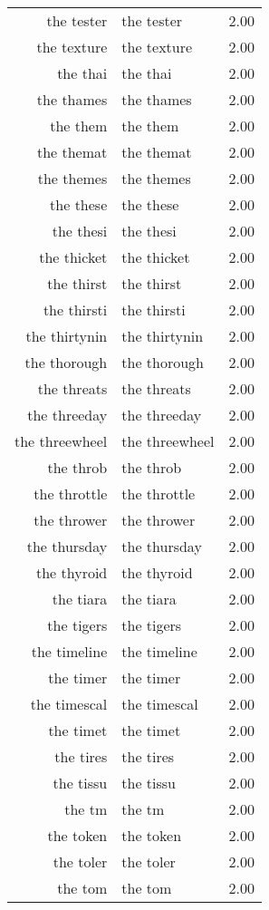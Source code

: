 \begin{table}[ht]
\begin{tabular}{rlr}
  the tester & the tester & 2.00 \\ 
  the texture & the texture & 2.00 \\ 
  the thai & the thai & 2.00 \\ 
  the thames & the thames & 2.00 \\ 
  the them & the them & 2.00 \\ 
  the themat & the themat & 2.00 \\ 
  the themes & the themes & 2.00 \\ 
  the these & the these & 2.00 \\ 
  the thesi & the thesi & 2.00 \\ 
  the thicket & the thicket & 2.00 \\ 
  the thirst & the thirst & 2.00 \\ 
  the thirsti & the thirsti & 2.00 \\ 
  the thirtynin & the thirtynin & 2.00 \\ 
  the thorough & the thorough & 2.00 \\ 
  the threats & the threats & 2.00 \\ 
  the threeday & the threeday & 2.00 \\ 
  the threewheel & the threewheel & 2.00 \\ 
  the throb & the throb & 2.00 \\ 
  the throttle & the throttle & 2.00 \\ 
  the thrower & the thrower & 2.00 \\ 
  the thursday & the thursday & 2.00 \\ 
  the thyroid & the thyroid & 2.00 \\ 
  the tiara & the tiara & 2.00 \\ 
  the tigers & the tigers & 2.00 \\ 
  the timeline & the timeline & 2.00 \\ 
  the timer & the timer & 2.00 \\ 
  the timescal & the timescal & 2.00 \\ 
  the timet & the timet & 2.00 \\ 
  the tires & the tires & 2.00 \\ 
  the tissu & the tissu & 2.00 \\ 
  the tm & the tm & 2.00 \\ 
  the token & the token & 2.00 \\ 
  the toler & the toler & 2.00 \\ 
  the tom & the tom & 2.00 \\ 

\end{tabular}
\end{table}
